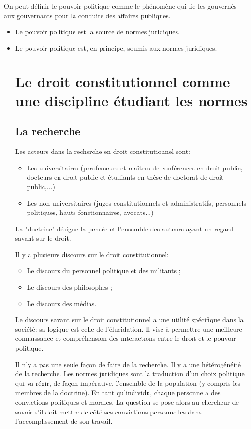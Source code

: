 ﻿\documentclass[12pt, a4paper, openany]{book}
\begin{document}
On peut définir le pouvoir politique comme le phénomène qui lie les gouvernés aux gouvernants pour la conduite des affaires publiques.
\begin{itemize}
\item Le pouvoir politique est la source de normes juridiques.
\item Le pouvoir politique est, en principe, soumis aux normes juridiques.

	\section{Le droit constitutionnel comme une discipline étudiant les normes}

		\subsection{La recherche}

Les acteurs dans la recherche en droit constitutionnel sont:
\begin{itemize}
\item Les universitaires (prrofesseurs et maîtres de conférences en droit public, docteurs en droit public et étudiants en thèse de doctorat de droit public,...)
\item Les non universitaires (juges constitutionnels et administratifs, personnels politiques, hauts fonctionnaires, avocats...)
\end{itemize}

La "doctrine" désigne la pensée et l'ensemble des auteurs ayant un regard savant sur le droit.

Il y a plusieurs discours sur le droit constitutionnel:
\begin{itemize}
\item Le discours du personnel politique et des militants ;
\item Le discours des philosophes ;
\item Le discours des médias.
\end{itemize}

Le discours savant sur le droit constitutionnel a une utilité spécifique dans la société: sa logique est celle de l'élucidation. Il vise à permettre une meilleure connaissance et compréhension des interactions entre le droit et le pouvoir politique.

Il n'y a pas une seule façon de faire de la recherche. Il y a une hétérogénéité de la recherche.
Les normes juridiques sont la traduction d'un choix politique qui va régir, de façon impérative, l'ensemble de la population (y compris les membres de la doctrine). En tant qu'individu, chaque personne a des convictions politiques et morales. La question se pose alors au chercheur de savoir s'il doit mettre de côté ses convictions personnelles dans l'accomplissement de son travail.


\end{itemize}
\end{document}
